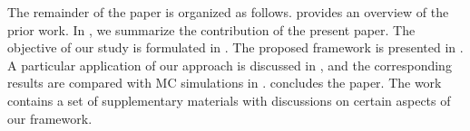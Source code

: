 The remainder of the paper is organized as follows.
 provides an overview of the prior work.
In , we summarize the contribution of the present paper.
The objective of our study is formulated in .
The proposed framework is presented in .
A particular application of our approach is discussed in , and the corresponding results are compared with MC simulations in .
 concludes the paper.
The work contains a set of supplementary materials with discussions on certain aspects of our framework.
